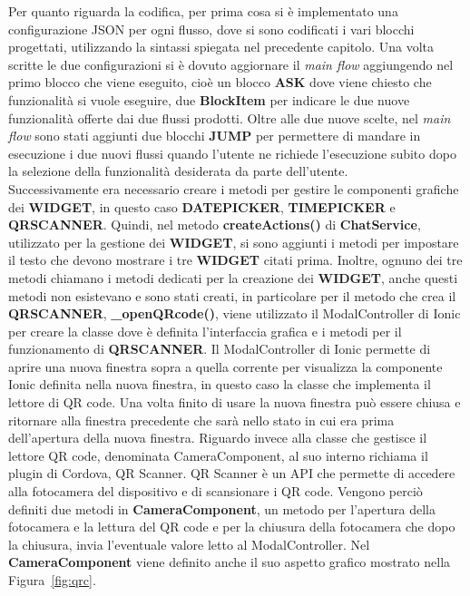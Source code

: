 Per quanto riguarda la codifica, per prima cosa si è implementato una configurazione JSON per ogni flusso, dove si sono codificati i vari blocchi progettati, utilizzando la sintassi spiegata nel precedente capitolo. Una volta scritte le due configurazioni si è dovuto aggiornare il \emph{main flow} aggiungendo nel primo blocco che viene eseguito, cioè un blocco \textbf{ASK} dove viene chiesto che funzionalità si vuole eseguire, due \textbf{BlockItem} per indicare le due nuove funzionalità offerte dai due flussi prodotti. Oltre alle due nuove scelte, nel \emph{main flow} sono stati aggiunti due blocchi \textbf{JUMP} per permettere di mandare in esecuzione i due nuovi flussi quando l'utente ne richiede l'esecuzione subito dopo la selezione della funzionalità desiderata da parte dell'utente.\\

 Successivamente era necessario creare i metodi per gestire le componenti grafiche dei \textbf{WIDGET}, in questo caso \textbf{DATEPICKER}, \textbf{TIMEPICKER} e \textbf{QRSCANNER}. Quindi, nel metodo \textbf{createActions()} di \textbf{ChatService}, utilizzato per la gestione dei \textbf{WIDGET}, si sono aggiunti i metodi per impostare il testo che devono mostrare i tre \textbf{WIDGET} citati prima. Inoltre, ognuno dei tre metodi chiamano i metodi dedicati per la creazione dei \textbf{WIDGET}, anche questi metodi non esistevano e sono stati creati, in particolare per il metodo che crea il \textbf{QRSCANNER}, \textbf{\_openQRcode()}, viene utilizzato il ModalController di Ionic per creare la classe dove è definita l'interfaccia grafica e i metodi per il funzionamento di \textbf{QRSCANNER}. Il ModalController di Ionic permette di aprire una nuova finestra sopra a quella corrente per visualizza la componente Ionic definita nella nuova finestra, in questo caso la classe che implementa il lettore di QR code. Una volta finito di usare la nuova finestra può essere chiusa e ritornare alla finestra precedente che sarà nello stato in cui era prima dell'apertura della nuova finestra. Riguardo invece alla classe che gestisce il lettore QR code, denominata CameraComponent, al suo interno richiama il plugin di Cordova, QR Scanner. QR Scanner è un API che permette di accedere alla fotocamera del dispositivo e di scansionare i QR code. Vengono perciò definiti due metodi in \textbf{CameraComponent}, un metodo per l'apertura della fotocamera e la lettura del QR code e per la chiusura della fotocamera che dopo la chiusura, invia l'eventuale valore letto al ModalController. Nel \textbf{CameraComponent} viene definito anche il suo aspetto grafico mostrato nella Figura~\ref{fig:qrc}.\\
 
